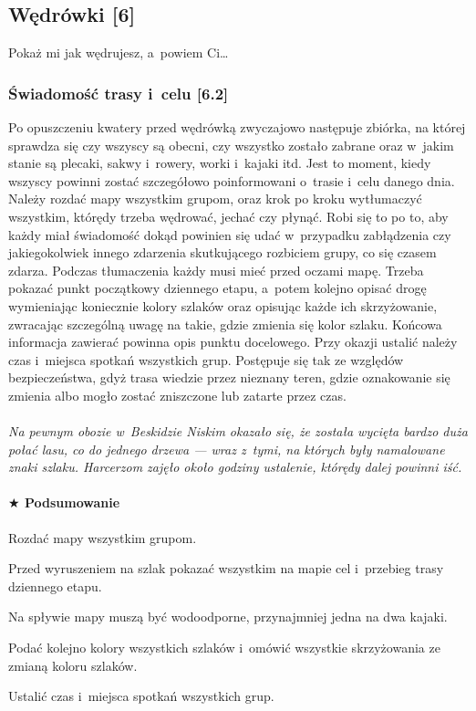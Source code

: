\documentclass[a5paper,10pt,titlepage,twoside]{article}
\newcommand*{\thecheckbox}{\hss$\Box$} %
\newenvironment*{checklist}
{\list{}{%
\renewcommand*{\makelabel}[1]{\thecheckbox}}}
{\endlist}
\begin{document}
\subsection{Wędrówki [6]}
Pokaż mi jak wędrujesz, a~powiem Ci\ldots
\subsubsection{Świadomość trasy i~celu [6.2]}
Po opuszczeniu kwatery przed wędrówką zwyczajowo następuje zbiórka, na której sprawdza się czy wszyscy są obecni, czy wszystko zostało zabrane oraz w~jakim stanie są plecaki, sakwy i~rowery, worki i~kajaki itd. Jest to moment, kiedy wszyscy powinni zostać szczegółowo poinformowani o~trasie i~celu danego dnia. Należy rozdać mapy wszystkim grupom, oraz krok po kroku wytłumaczyć wszystkim, którędy trzeba wędrować, jechać czy płynąć. Robi się to po to, aby każdy miał świadomość dokąd powinien się udać w~przypadku zabłądzenia czy jakiegokolwiek innego zdarzenia skutkującego rozbiciem grupy, co się czasem zdarza. Podczas tłumaczenia każdy musi mieć przed oczami mapę. Trzeba pokazać punkt początkowy dziennego etapu, a~potem kolejno opisać drogę wymieniając koniecznie kolory szlaków oraz opisując każde ich skrzyżowanie, zwracając szczególną uwagę na takie, gdzie zmienia się kolor szlaku. Końcowa informacja zawierać powinna opis punktu docelowego. Przy okazji ustalić należy czas i~miejsca spotkań wszystkich grup. Postępuje się tak ze względów bezpieczeństwa, gdyż trasa wiedzie przez nieznany teren, gdzie oznakowanie się zmienia albo mogło zostać zniszczone lub zatarte przez czas.
\\
\\
\small{
\emph{Na pewnym obozie w~Beskidzie Niskim okazało się, że została wycięta bardzo duża połać lasu, co do jednego drzewa --- wraz z~tymi, na których były namalowane znaki szlaku. Harcerzom zajęło około godziny ustalenie, którędy dalej powinni iść.}}
\paragraph{$\bigstar$ Podsumowanie}
\begin{checklist}
\item Rozdać mapy wszystkim grupom.
\item Przed wyruszeniem na szlak pokazać wszystkim na mapie cel i~przebieg trasy dziennego etapu.
\item Na spływie mapy muszą być wodoodporne, przynajmniej jedna na dwa kajaki.
\item Podać kolejno kolory wszystkich szlaków i~omówić wszystkie skrzyżowania ze zmianą koloru szlaków.
\item Ustalić czas i~miejsca spotkań wszystkich grup.
\end{checklist}
\end{document}
